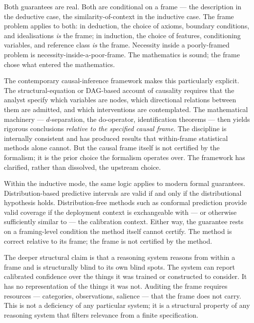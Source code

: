 \documentclass[11pt,a4paper]{article}
\begin{document}
Both guarantees are real. Both are conditional on a frame --- the
description in the deductive case, the similarity-of-context in the
inductive case. The frame problem applies to both: in deduction, the
choice of axioms, boundary conditions, and idealisations \emph{is} the
frame; in induction, the choice of features, conditioning variables, and
reference class \emph{is} the frame. Necessity inside a poorly-framed
problem is necessity-inside-a-poor-frame. The mathematics is sound; the
frame chose what entered the mathematics.

The contemporary causal-inference framework makes this particularly
explicit. The structural-equation or DAG-based account of causality
\citep{Pearl1988,Pearl2009,Hernan2020} requires that the analyst specify
which variables are nodes, which directional relations between them are
admitted, and which interventions are contemplated. The mathematical
machinery --- $d$-separation, the do-operator, identification theorems
--- then yields rigorous conclusions \emph{relative to the specified
causal frame}. The discipline is internally consistent and has produced
results that within-frame statistical methods alone cannot. But the
causal frame itself is not certified by the formalism; it is the prior
choice the formalism operates over. The framework has clarified, rather
than dissolved, the upstream choice.

Within the inductive mode, the same logic applies to modern formal
guarantees. Distribution-based predictive intervals are valid if and only
if the distributional hypothesis holds. Distribution-free methods such as
conformal prediction \citep{Vovk2005,AngelopoulosBates2023} provide valid
coverage if the deployment context is exchangeable with --- or otherwise
sufficiently similar to --- the calibration context. Either way, the
guarantee rests on a framing-level condition the method itself cannot
certify. The method is correct relative to its frame; the frame is not
certified by the method.

The deeper structural claim is that a reasoning system reasons from
within a frame and is structurally blind to its own blind spots. The
system can report calibrated confidence over the things it was trained or
constructed to consider. It has no representation of the things it was
not. Auditing the frame requires resources --- categories, observations,
salience --- that the frame does not carry. This is not a deficiency of
any particular system; it is a structural property of any reasoning
system that filters relevance from a finite specification.
\end{document}
